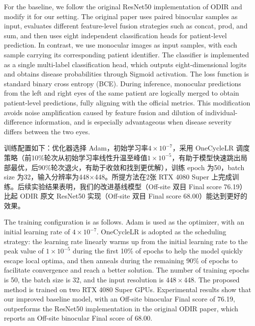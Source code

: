 For the baseline, we follow the original ResNet50 implementation of ODIR and modify it for our setting. The original paper uses paired binocular samples as input, evaluates different feature-level fusion strategies such as concat, prod, and sum, and then uses eight independent classification heads for patient-level prediction. In contrast, we use monocular images as input samples, with each sample carrying its corresponding patient identifier. The classifier is implemented as a single multi-label classification head, which outputs eight-dimensional logits and obtains disease probabilities through Sigmoid activation. The loss function is standard binary cross entropy (BCE). During inference, monocular predictions from the left and right eyes of the same patient are logically merged to obtain patient-level predictions, fully aligning with the official metrics. This modification avoids noise amplification caused by feature fusion and dilution of individual-difference information, and is especially advantageous when disease severity differs between the two eyes.

训练配置如下：优化器选择 Adam，初始学习率\(4 \times 10^{-7}\)，采用 OneCycleLR 调度策略（前10\%轮次从初始学习率线性升温至峰值\(1 \times 10^{-5}\)，有助于模型快速跳出局部最优，后90\%轮次退火，有助于收敛和找到更优解），训练 epoch 为50，batch size 为32，输入分辨率为448×448。所提方法在2张 RTX 4080 Super 上完成训练。后续实验结果表明，我们的改进基线模型（Off-site 双目 Final score 76.19）比起 ODIR 原文 ResNet50 实现（Off-site 双目 Final score 68.00）能达到更好的效果。

The training configuration is as follows. Adam is used as the optimizer, with an initial learning rate of \(4 \times 10^{-7}\). OneCycleLR is adopted as the scheduling strategy: the learning rate linearly warms up from the initial learning rate to the peak value of \(1 \times 10^{-5}\) during the first 10\% of epochs to help the model quickly escape local optima, and then anneals during the remaining 90\% of epochs to facilitate convergence and reach a better solution. The number of training epochs is 50, the batch size is 32, and the input resolution is \(448 \times 448\). The proposed method is trained on two RTX 4080 Super GPUs. Experimental results show that our improved baseline model, with an Off-site binocular Final score of 76.19, outperforms the ResNet50 implementation in the original ODIR paper, which reports an Off-site binocular Final score of 68.00.


